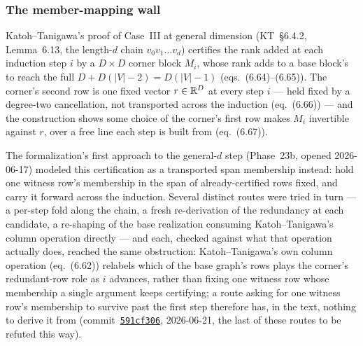 \subsubsection{The member-mapping wall}

Katoh--Tanigawa's proof of Case~III at general dimension (KT~\S6.4.2,
Lemma~6.13, the length-$d$ chain $v_0 v_1 \dots v_d$) certifies the rank
added at each induction step $i$ by a $D \times D$ corner block $M_i$, whose
rank adds to a base block's to reach the full $D + D(|V|-2) = D(|V|-1)$
(eqs.~(6.64)--(6.65)). The corner's second row is one fixed vector $r \in
{\mathbb{R}}^D$ at every step $i$ --- held fixed by a degree-two cancellation, not
transported across the induction (eq.~(6.66)) --- and the construction
shows some choice of the corner's first row makes $M_i$ invertible against
$r$, over a free line each step is built from (eq.~(6.67)).

The formalization's first approach to the general-$d$ step (Phase~23b,
opened 2026-06-17) modeled this certification as a transported span
membership instead: hold one witness row's membership in the span of
already-certified rows fixed, and carry it forward across the induction.
Several distinct routes were tried in turn --- a per-step fold along the
chain, a fresh re-derivation of the redundancy at each candidate, a
re-shaping of the base realization consuming Katoh--Tanigawa's column
operation directly --- and each, checked against what that operation
actually does, reached the same obstruction: Katoh--Tanigawa's own column
operation (eq.~(6.62)) relabels which of the base graph's rows plays the
corner's redundant-row role as $i$ advances, rather than fixing one witness
row whose membership a single argument keeps certifying; a route asking for
one witness row's membership to survive past the first step therefore has,
in the text, nothing to derive it from
(commit~\href{https://github.com/bryangingechen/CombinatorialRigidity/commit/591cf306465c63b0fa13c55fab4b17a38f131cf0}{\texttt{591cf306}},
2026-06-21, the last of these routes to be refuted this way).

